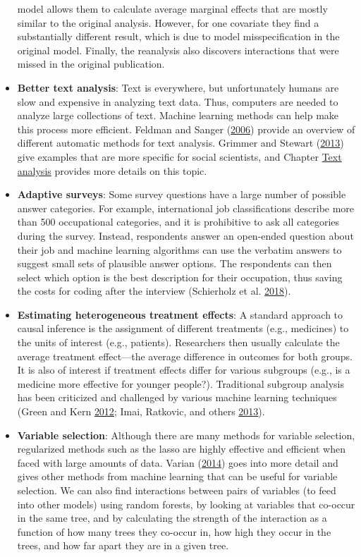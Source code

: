 \documentclass[]{krantz}
\begin{document}
\begin{itemize}
  model allows them to calculate average marginal effects that are
  mostly similar to the original analysis. However, for one covariate
  they find a substantially different result, which is due to model
  misspecification in the original model. Finally, the reanalysis also
  discovers interactions that were missed in the original publication.
\item
  \textbf{Better text analysis}: Text is everywhere, but unfortunately
  humans are slow and expensive in analyzing text data. Thus, computers
  are needed to analyze large collections of text. Machine learning
  methods can help make this process more efficient. Feldman and Sanger
  (\protect\hyperlink{ref-FeldmanSanger}{2006}) provide an overview of
  different automatic methods for text analysis. Grimmer and Stewart
  (\protect\hyperlink{ref-grimmer2013text}{2013}) give examples that are
  more specific for social scientists, and Chapter
  \protect\hyperlink{chap:text}{Text analysis} provides more details on
  this topic.
\item
  \textbf{Adaptive surveys}: Some survey questions have a large number
  of possible answer categories. For example, international job
  classifications describe more than 500 occupational categories, and it
  is prohibitive to ask all categories during the survey. Instead,
  respondents answer an open-ended question about their job and machine
  learning algorithms can use the verbatim answers to suggest small sets
  of plausible answer options. The respondents can then select which
  option is the best description for their occupation, thus saving the
  costs for coding after the interview (Schierholz et al.
  \protect\hyperlink{ref-Schierholz2018}{2018}).
\item
  \textbf{Estimating heterogeneous treatment effects}: A standard
  approach to causal inference is the assignment of different treatments
  (e.g., medicines) to the units of interest (e.g., patients).
  Researchers then usually calculate the average treatment effect---the
  average difference in outcomes for both groups. It is also of interest
  if treatment effects differ for various subgroups (e.g., is a medicine
  more effective for younger people?). Traditional subgroup analysis has
  been criticized and challenged by various machine learning techniques
  (Green and Kern \protect\hyperlink{ref-green2012modeling}{2012}; Imai,
  Ratkovic, and others
  \protect\hyperlink{ref-imai2013estimating}{2013}).
\item
  \textbf{Variable selection}: Although there are many methods for
  variable selection, regularized methods such as the lasso are highly
  effective and efficient when faced with large amounts of data. Varian
  (\protect\hyperlink{ref-varian2014big}{2014}) goes into more detail
  and gives other methods from machine learning that can be useful for
  variable selection. We can also find interactions between pairs of
  variables (to feed into other models) using random forests, by looking
  at variables that co-occur in the same tree, and by calculating the
  strength of the interaction as a function of how many trees they
  co-occur in, how high they occur in the trees, and how far apart they
  are in a given tree.
\end{itemize}
\end{document}
